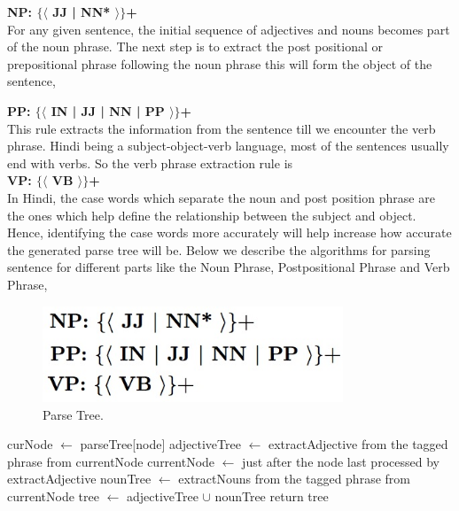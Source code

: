 \textbf {NP: $\{ \langle$ JJ | NN* $\rangle \}$+}  \\

For any given sentence, the initial sequence of adjectives and nouns becomes part of the noun phrase. The next step is to extract the post positional or prepositional phrase following the noun phrase this will form the object of the sentence,

\textbf {PP: $\{ \langle$ IN | JJ | NN | PP $\rangle \}$+} \\

This rule extracts the information from the sentence till we encounter the verb phrase. Hindi being a subject-object-verb language, most of the sentences usually end with verbs. So the verb phrase extraction rule is \\

\textbf {VP: $\{ \langle$ VB $\rangle \}$+} \\

In Hindi, the case words which separate the noun and post position phrase are the ones which help define the relationship between the subject and object. Hence, identifying the case words more accurately will help increase how accurate the generated parse tree will be. Below we describe the algorithms for parsing sentence for different parts like the Noun Phrase, Postpositional Phrase and Verb Phrase,

\begin{figure}[htb]
\centering
\includegraphics[width=0.8\textwidth]{images/gammarrules.jpg}
\caption{Parse Tree.} 
\label{fig:gammarrules}
\end{figure}

\begin {algorithm}
\caption {Extract Noun Phrase}
\begin {algorithmic}[1]
\State curNode $\gets$ parseTree[node]
\State adjectiveTree $\gets$ extractAdjective from the tagged phrase from currentNode
\State currentNode $\gets$ just after the node last processed by extractAdjective
\State nounTree $\gets$ extractNouns from the tagged phrase from currentNode
\State tree $\gets$ adjectiveTree $\cup$ nounTree 
\State return tree
\EndProcedure		
\end {algorithmic}
\end {algorithm}

